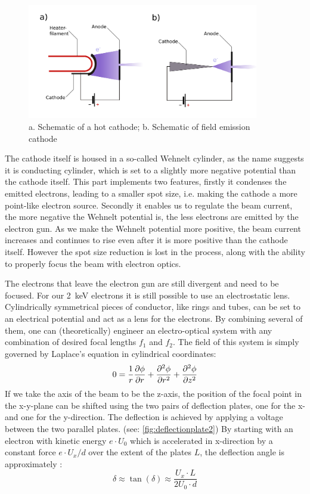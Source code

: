 \begin{figure}
	\centering
	\includegraphics[width=0.9\textwidth]{Chapters/CRT-Basics/HotCathodeColdCathode}
	\caption{a. Schematic of a hot cathode; b. Schematic of field emission cathode}
	\label{fig:hotcathodecoldcathode}
\end{figure}

The cathode itself is housed in a so-called Wehnelt cylinder, as the name suggests it is conducting cylinder, which is set to a slightly more negative potential than the cathode itself. This part implements two features, firstly it condenses the emitted electrons, leading to a smaller spot size, i.e. making the cathode a more point-like electron source. Secondly it enables us to regulate the beam current, the more negative the Wehnelt potential is, the less electrons are emitted by the electron gun. As we make the Wehnelt potential more positive, the beam current increases and continues to rise even after it is more positive than the cathode itself. However the spot size reduction is lost in the process, along with the ability to properly focus the beam with electron optics.

The electrons that leave the electron gun are still divergent and need to be focused. For our \SI{2}{\kilo\electronvolt} electrons it is still possible to use an electrostatic lens. Cylindrically symmetrical pieces of conductor, like rings and tubes, can be set to an electrical potential and act as a lens for the electrons. By combining several of them, one can (theoretically) engineer an electro-optical system with any combination of desired focal lengths $f_1$ and $f_2$. The field of this system is simply governed by Laplace's equation in cylindrical coordinates:
\begin{equation}
	0=\dfrac{1}{r}\pdv{\phi}{r}+\pdv[2]{\phi}{r}+\pdv[2]{\phi}{z}
\end{equation}
If we take the axis of the beam to be the z-axis, the position of the focal point in the x-y-plane can be shifted using the two pairs of deflection plates, one for the x- and one for the y-direction. The deflection is achieved by applying a voltage between the two parallel plates. (see: \cref{fig:deflectionplate2}) By starting with an electron with kinetic energy $e \cdot U_0$ which is accelerated in x-direction by a constant force $e\cdot U_x / d$ over the extent of the plates $L$, the deflection angle is approximately \cite{Demtroeder3}:
\begin{equation}\label{key}
	\delta \approx \tan(\delta) \approx \frac{U_x\cdot L}{2 U_0 \cdot d}
\end{equation}

